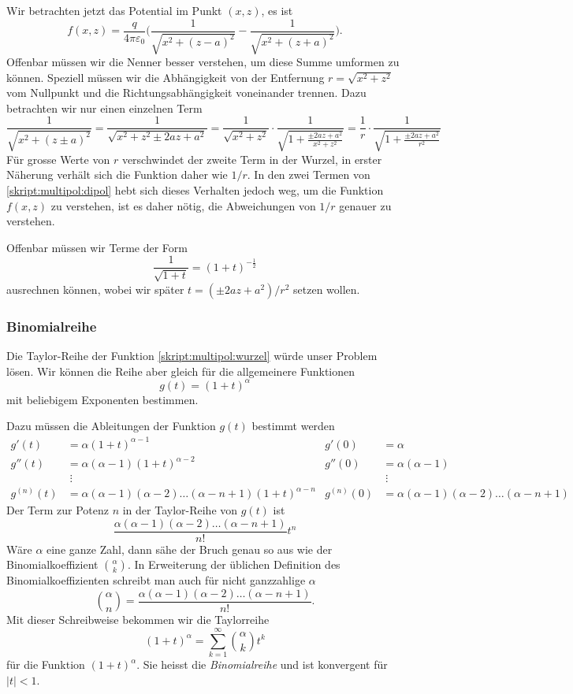 Wir betrachten jetzt das Potential im Punkt $(x,z)$, es ist
\begin{equation}
f(x,z)
=
\frac{q}{4\pi\varepsilon_0}
\biggl(
\frac{1}{\sqrt{x^2 + (z-a)^2}}
-
\frac{1}{\sqrt{x^2 + (z+a)^2}}
\biggr).
\label{skript:multipol:dipol}
\end{equation}
Offenbar müssen wir die Nenner besser verstehen, um diese Summe 
umformen zu können.
Speziell müssen wir die Abhängigkeit von der Entfernung
$r=\sqrt{x^2+z^2}$ vom Nullpunkt
und die Richtungsabhängigkeit voneinander trennen.
Dazu betrachten wir nur einen einzelnen Term
\[
\frac{1}{\sqrt{x^2+(z\pm a)^2}}
=
\frac{1}{\sqrt{x^2+z^2\pm 2az+a^2}}
=
\frac{1}{\sqrt{x^2+z^2}} \cdot \frac{1}{\sqrt{1+\frac{\pm 2az+a^2}{x^2+z^2}}}
=
\frac{1}{r} \cdot \frac{1}{\sqrt{1+\frac{\pm 2az+a^2}{r^2}}}
\]
Für grosse Werte von $r$ verschwindet der zweite Term in der Wurzel,
in erster Näherung verhält sich die Funktion daher wie $1/r$.
In den zwei Termen von \eqref{skript:multipol:dipol} hebt sich dieses
Verhalten jedoch weg, um die Funktion $f(x,z)$ zu verstehen, ist es
daher nötig, die Abweichungen von $1/r$ genauer zu verstehen.

Offenbar müssen wir Terme der Form
\begin{equation}
\frac{1}{\sqrt{1+t}}
=
(1+t)^{-\frac12}
\label{skript:multipol:wurzel}
\end{equation}
ausrechnen können, wobei wir später $t=(\pm2az+a^2)/r^2$ setzen wollen.

\subsubsection{Binomialreihe}
Die Taylor-Reihe der Funktion \eqref{skript:multipol:wurzel}
würde unser Problem lösen. 
Wir können die Reihe aber gleich für die
allgemeinere Funktionen
\begin{equation}
g(t)=(1+t)^\alpha
\end{equation}
mit beliebigem Exponenten bestimmen.

Dazu müssen die Ableitungen der Funktion $g(t)$ bestimmt werden
\begin{align*}
g'(t)
&=
\alpha(1+t)^{\alpha-1}
&
g'(0)&=\alpha
\\
g''(t)
&=
\alpha(\alpha-1)(1+t)^{\alpha-2}
&
g''(0)&=\alpha(\alpha-1)
\\
&\;\vdots
&
&\;\vdots
\\
g^{(n)}(t)
&=
\alpha(\alpha-1)(\alpha-2)\dots(\alpha-n+1) (1+t)^{\alpha -n}
&
g^{(n)}(0)&=\alpha(\alpha-1)(\alpha-2)\dots(\alpha -n +1)
\end{align*}
Der Term zur Potenz $n$ in der Taylor-Reihe von $g(t)$ ist
\[
\frac{\alpha(\alpha-1)(\alpha-2)\dots(\alpha-n+1)}{n!} t^n
\]
Wäre $\alpha$ eine ganze Zahl, dann sähe der Bruch
genau so aus wie der Binomialkoeffizient $\binom{\alpha}{k}$.
In Erweiterung der üblichen Definition des Binomialkoeffizienten
schreibt man auch für nicht ganzzahlige $\alpha$
\[
\binom{\alpha}{n}
=
\frac{\alpha(\alpha-1)(\alpha-2)\dots(\alpha-n+1)}{n!}.
\]
Mit dieser Schreibweise bekommen wir die Taylorreihe
\[
(1+t)^\alpha=\sum_{k=1}^\infty \binom{\alpha}{k} t^k
\]
für die Funktion $(1+t)^\alpha$.
Sie heisst die {\em Binomialreihe} und ist konvergent für $|t|<1$.

